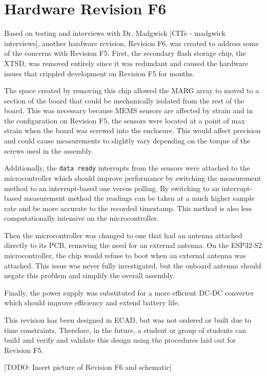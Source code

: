 \section{Hardware Revision F6}
Based on testing and interviews with Dr. Madgwick [CITe - madgwick interviews], another hardware revision, Revision F6, was created to address some of the concerns with Revision F5.
First, the secondary flash storage chip, the XTSD, was removed entirely since it was redundant and caused the hardware issues that crippled development on Revision F5 for months.

The space created by removing this chip allowed the MARG array to moved to a section of the board that could be mechanically isolated from the rest of the board.
This was necessary because MEMS sensors are affected by strain and in the configuration on Revision F5, the sensors were located at a point of max strain when the board was screwed into the enclosure.
This would affect precision and could cause measurements to slightly vary depending on the torque of the screws used in the assembly.

Additionally, the \lstinline[style=customInline]|data ready| interrupts from the sensors were attached to the microcontroller which should improve performance by switching the measurement method to an interrupt-based one versus polling.
By switching to an interrupt-based measurement method the readings can be taken at a much higher sample rate and be more accurate to the recorded timestamp.
This method is also less computationally intensive on the microcontroller.

Then the microcontroller was changed to one that had an antenna attached directly to its PCB, removing the need for an external antenna.
On the ESP32-S2 microcontroller, the chip would refuse to boot when an external antenna was attached.
This issue was never fully investigated, but the onboard antenna should negate this problem and simplify the overall assembly.

Finally, the power supply was substituted for a more efficient DC-DC converter which should improve efficiency and extend battery life.

This revision has been designed in ECAD, but was not ordered or built due to time constraints.
Therefore, in the future, a student or group of students can build and verify and validate this design using the procedures laid out for Revision F5.

[TODO: Insert picture of Revision F6 and schematic]

